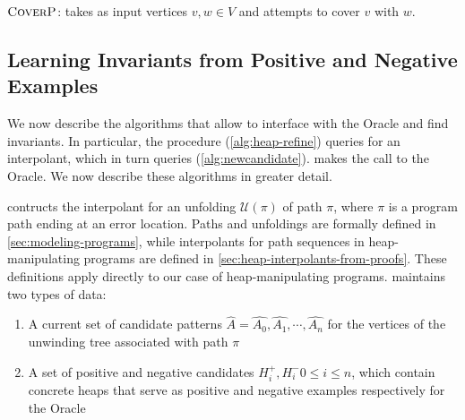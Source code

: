 \begin{algorithm}[ht]


  \caption{$\textsc{CoverP}$: takes as input vertices $v, w \in V$ and attempts to cover $v$ with $w$.}
  \label{alg:heap-cover}
\end{algorithm}

\subsection*{Learning Invariants from Positive and Negative Examples}

We now describe the algorithms that allow \verifier to interface with the Oracle and find invariants. In particular, the  procedure (\autoref{alg:heap-refine}) queries \seplearner for an interpolant, which in turn queries \newcandidate (\autoref{alg:newcandidate}). \newcandidate makes the call to the Oracle. We now describe these algorithms in greater detail.

\seplearner contructs the interpolant for an unfolding $\mathcal{U}(\pi)$ of path $\pi$, where $\pi$ is a program path ending at an error location. Paths and unfoldings are formally defined in \autoref{sec:modeling-programs}, while interpolants for path sequences in heap-manipulating programs are defined in \autoref{sec:heap-interpolants-from-proofs}. These definitions apply directly to our case of heap-manipulating programs. \seplearner maintains two types of data:

\begin{enumerate}
  \item A current set of candidate patterns $\hat{A} = \hat{A_0}, \hat{A_1}, \cdots, \hat{A_n}$ for the vertices of the unwinding tree associated with path $\pi$
  \item A set of positive and negative candidates $H_i^{+}, H_i^{-} 0 \leq i \leq n$, which contain concrete heaps that serve as positive and negative examples respectively for the Oracle
\end{enumerate}

